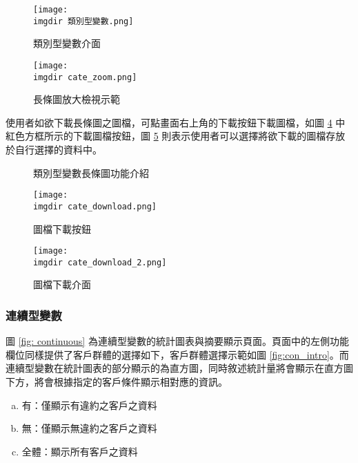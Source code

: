 \documentclass[12pt, a4paper]{article}
\begin{document}
\begin{figure}[H]
    \centering
        \texttt{[image: 
        \\imgdir 類別型變數.png]}
     \caption{類別型變數介面}
    \label{fig: categorical}
\end{figure}

\begin{figure}[H]
    \centering
        \texttt{[image: 
        \\imgdir cate\_zoom.png]}
     \caption{長條圖放大檢視示範}
    \label{fig: cate_zoom}
\end{figure}

使用者如欲下載長條圖之圖檔，可點畫面右上角的下載按鈕下載圖檔，如圖 \ref{fig: cate_buttom} 中紅色方框所示的下載圖檔按鈕，圖 \ref{fig: cate_download_page} 則表示使用者可以選擇將欲下載的圖檔存放於自行選擇的資料中。


\begin{figure}[H]
	\centering
	
	
	
	
	\caption{類別型變數長條圖功能介紹}\label{fig:cate_intro}
\end{figure}


\begin{figure}[H]
    \centering
        \texttt{[image: 
        \\imgdir cate\_download.png]}
     \caption{圖檔下載按鈕}
    \label{fig: cate_buttom}
\end{figure}

\begin{figure}[H]
    \centering
        \texttt{[image: 
        \\imgdir cate\_download\_2.png]}
     \caption{圖檔下載介面}
    \label{fig: cate_download_page}
\end{figure}


\subsubsection{連續型變數}

圖 \ref{fig: continuous} 為連續型變數的統計圖表與摘要顯示頁面。頁面中的左側功能欄位同樣提供了客戶群體的選擇如下，客戶群體選擇示範如圖 \ref{fig:con_intro}。而連續型變數在統計圖表的部分顯示的為直方圖，同時敘述統計量將會顯示在直方圖下方，將會根據指定的客戶條件顯示相對應的資訊。
\begin{enumerate}[(a)]
\item 有：僅顯示有違約之客戶之資料 
\item 無：僅顯示無違約之客戶之資料
\item 全體：顯示所有客戶之資料
\end{enumerate}
\end{document}
